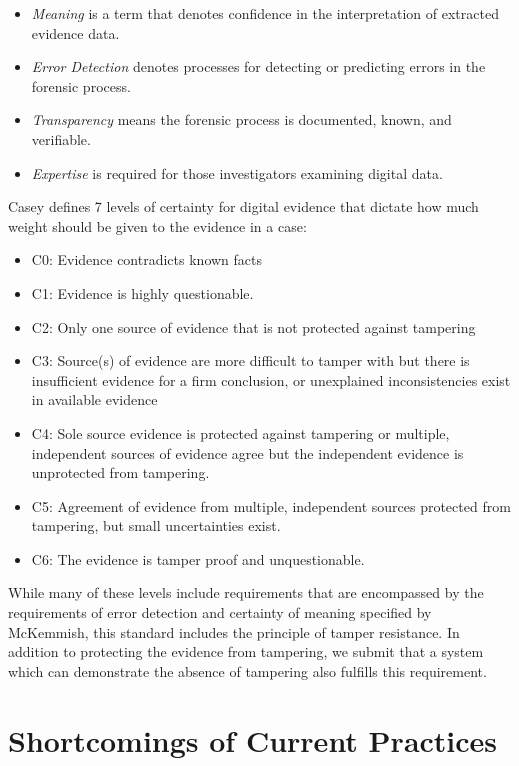 \documentclass{report}
\begin{document}
\begin{itemize}
\item \emph{Meaning} is a term that denotes confidence in the interpretation of extracted evidence data.
\item \emph{Error Detection} denotes processes for detecting or predicting errors in the forensic process.
\item \emph{Transparency} means the forensic process is documented, known, and verifiable.
\item \emph{Expertise} is required for those investigators examining digital data.
\end{itemize}

Casey \cite{casey2002} defines 7 levels of certainty for digital evidence that dictate how much weight should be given to the evidence in a case:

\begin{itemize}
\item C0: Evidence contradicts known facts
\item C1: Evidence is highly questionable.
\item C2: Only one source of evidence that is not protected against tampering
\item C3: Source(s) of evidence are more difficult to tamper with but there is insufficient evidence for a firm conclusion, or unexplained inconsistencies exist in available evidence
\item C4: Sole source evidence is protected against tampering or multiple, independent sources of evidence agree but the independent evidence is unprotected from tampering.
\item C5: Agreement of evidence from multiple, independent sources protected from tampering, but small uncertainties exist.
\item C6: The evidence is tamper proof and unquestionable.
\end{itemize}

While many of these levels include requirements that are encompassed by the requirements of error detection and certainty of meaning 
specified by McKemmish, this standard includes the principle of tamper resistance. In addition to protecting the evidence from tampering, 
we submit that a system which can demonstrate the absence of tampering also fulfills this requirement.

\section{Shortcomings of Current Practices}
\end{document}
